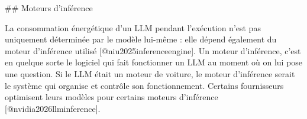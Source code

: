 ## Moteurs d'inférence

La consommation énergétique d'un LLM pendant l'exécution n'est pas uniquement déterminée par le modèle lui-même : elle dépend également du moteur d'inférence utilisé [@niu2025inferenceengine].
Un moteur d'inférence, c'est en quelque sorte le logiciel qui fait fonctionner un LLM au moment où on lui pose une question.
Si le LLM était un moteur de voiture, le moteur d'inférence serait le système qui organise et contrôle son fonctionnement.
Certains fournisseurs optimisent leurs modèles pour certains moteurs d'inférence [@nvidia2026llminference].
